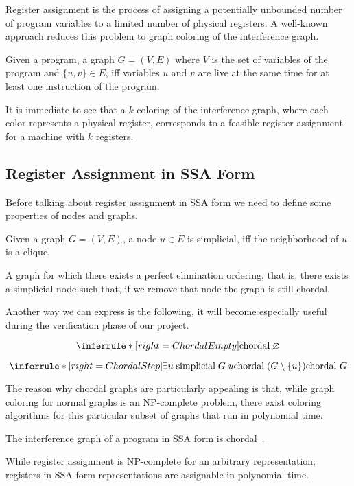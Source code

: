 Register assignment is the process of assigning a potentially unbounded number of program variables to a limited number of physical registers. A well-known approach reduces this problem to graph coloring of the interference graph.

\begin{definition}\label{def:ig}
    Given a program, a graph $G = (V, E)$ where $V$ is the set of variables of the program and $\{ u, v \} \in E$, iff variables $u$ and $v$ are live at the same time for at least one instruction of the program.
\end{definition}

It is immediate to see that a $k$-coloring of the interference graph, where each color represents a physical register, corresponds to a feasible register assignment for a machine with $k$ registers.

\subsection{Register Assignment in SSA Form}
\label{subsec:ssara}

Before talking about register assignment in SSA form we need to define some properties of nodes and graphs.

\begin{definition}\label{def:simplicial}
    Given a graph $G = (V, E)$, a node $u \in E$ is simplicial, iff the neighborhood of $u$ is a clique.
\end{definition}

\begin{definition}\label{def:chordal}
    A graph for which there exists a perfect elimination ordering, that is, there exists a simplicial node such that, if we remove that node the graph is still chordal.
\end{definition}

Another way we can express  is the following, it will become especially useful during the verification phase of our project.

\[
\inferrule*[right=ChordalEmpty]{
}{
    \text{chordal} \; \varnothing
}
\]

\[
\inferrule*[right=ChordalStep]{
    \exists u \; \text{simplicial} \; G \; u \\
    \text{chordal} \; (G \setminus \{ u \})
}{
    \text{chordal } G
}
\]

The reason why chordal graphs are particularly appealing is that, while graph coloring for normal graphs is an NP-complete problem, there exist coloring algorithms for this particular subset of graphs that run in polynomial time.

\begin{theorem}[Chordality]
    The interference graph of a program in SSA form is chordal~\cite{...}.
\end{theorem}


While register assignment is NP-complete for an arbitrary representation, registers in SSA form representations are assignable in polynomial time.
